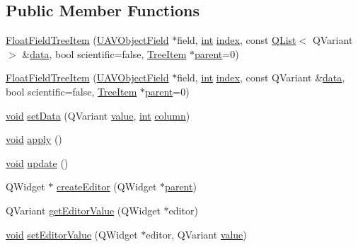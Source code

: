 \subsection*{Public Member Functions}
\begin{DoxyCompactItemize}
\item 
\hyperlink{group___u_a_v_object_browser_plugin_ga3b5f17797e8c15bda91990e0224e64fd}{Float\-Field\-Tree\-Item} (\hyperlink{class_u_a_v_object_field}{U\-A\-V\-Object\-Field} $\ast$field, \hyperlink{ioapi_8h_a787fa3cf048117ba7123753c1e74fcd6}{int} \hyperlink{glext_8h_ab47dd9958bcadea08866b42bf358e95e}{index}, const \hyperlink{class_q_list}{Q\-List}$<$ Q\-Variant $>$ \&\hyperlink{glext_8h_a8850df0785e6fbcc2351af3b686b8c7a}{data}, bool scientific=false, \hyperlink{class_tree_item}{Tree\-Item} $\ast$\hyperlink{group___u_a_v_object_browser_plugin_gaa3a7ba624312b6be70872634db291881}{parent}=0)
\item 
\hyperlink{group___u_a_v_object_browser_plugin_ga2295cc6ac1cdf63b9bf6a35970e79669}{Float\-Field\-Tree\-Item} (\hyperlink{class_u_a_v_object_field}{U\-A\-V\-Object\-Field} $\ast$field, \hyperlink{ioapi_8h_a787fa3cf048117ba7123753c1e74fcd6}{int} \hyperlink{glext_8h_ab47dd9958bcadea08866b42bf358e95e}{index}, const Q\-Variant \&\hyperlink{glext_8h_a8850df0785e6fbcc2351af3b686b8c7a}{data}, bool scientific=false, \hyperlink{class_tree_item}{Tree\-Item} $\ast$\hyperlink{group___u_a_v_object_browser_plugin_gaa3a7ba624312b6be70872634db291881}{parent}=0)
\item 
\hyperlink{group___u_a_v_objects_plugin_ga444cf2ff3f0ecbe028adce838d373f5c}{void} \hyperlink{group___u_a_v_object_browser_plugin_ga3af0226a4922471e79087adc2d268710}{set\-Data} (Q\-Variant \hyperlink{glext_8h_aa0e2e9cea7f208d28acda0480144beb0}{value}, \hyperlink{ioapi_8h_a787fa3cf048117ba7123753c1e74fcd6}{int} \hyperlink{glext_8h_a3b58c39b1b7ca6f4012b27e84de3bdb3}{column})
\item 
\hyperlink{group___u_a_v_objects_plugin_ga444cf2ff3f0ecbe028adce838d373f5c}{void} \hyperlink{group___u_a_v_object_browser_plugin_ga4d5f38d08a56c3392536899254daf7d8}{apply} ()
\item 
\hyperlink{group___u_a_v_objects_plugin_ga444cf2ff3f0ecbe028adce838d373f5c}{void} \hyperlink{group___u_a_v_object_browser_plugin_gaf8663356ac74e46312ee8bdfe6470d74}{update} ()
\item 
Q\-Widget $\ast$ \hyperlink{group___u_a_v_object_browser_plugin_ga2762101ef0435023c73583b23393a8c2}{create\-Editor} (Q\-Widget $\ast$\hyperlink{group___u_a_v_object_browser_plugin_gaa3a7ba624312b6be70872634db291881}{parent})
\item 
Q\-Variant \hyperlink{group___u_a_v_object_browser_plugin_gac22e37813e460949e795d4b18c110293}{get\-Editor\-Value} (Q\-Widget $\ast$editor)
\item 
\hyperlink{group___u_a_v_objects_plugin_ga444cf2ff3f0ecbe028adce838d373f5c}{void} \hyperlink{group___u_a_v_object_browser_plugin_gadf07cae542668ec439bf1514f07e4983}{set\-Editor\-Value} (Q\-Widget $\ast$editor, Q\-Variant \hyperlink{glext_8h_aa0e2e9cea7f208d28acda0480144beb0}{value})
\end{DoxyCompactItemize}
